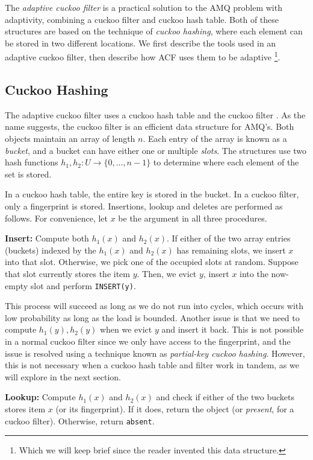 \documentclass[../paper.tex]{subfiles}
\begin{document}
\newcommand{\on}{\operatorname}
The \emph{adaptive cuckoo filter} \cite{adaptive-cuckoo} is a practical solution to the AMQ problem with adaptivity, combining a cuckoo filter and cuckoo hash table. Both of these structures are based on the
technique of \emph{cuckoo hashing}, where each element can be stored in two different locations. We first describe the tools used in an adaptive cuckoo filter, then describe how ACF uses them to be adaptive
\footnote{Which we will keep brief since the reader invented this data structure.}.

\subsection{Cuckoo Hashing}
The adaptive cuckoo filter uses a cuckoo hash table \cite{cuckoo-hash} and the cuckoo filter \cite{cuckoo-filter}. As the name suggests, the cuckoo filter is an
efficient data structure for AMQ's. Both objects maintain an array of length $n$. Each entry of the array is known as a \emph{bucket}, and a bucket can have either one or multiple \emph{slots}.
The structures use two hash functions $h_1,h_2:U\to \{0,\ldots,n-1\}$ to determine where each element of the set is stored.

In a cuckoo hash table, the entire key is stored in the bucket. In a cuckoo filter, only a fingerprint is stored. Insertions, lookup and deletes are performed as follows. For convenience, let $x$ be the argument in all three procedures.

\textbf{Insert:} Compute both $h_1(x)$ and $h_2(x)$. If either of the two array entries (buckets) indexed by the $h_1(x)$ and $h_2(x)$ has remaining slots, we insert $x$ into that slot.
Otherwise, we pick one of the occupied slots at random. Suppose that slot currently stores the item $y$. Then, we evict $y$, insert $x$ into the now-empty slot and perform \texttt{INSERT(y)}.

This process will succeed as long as we do not run into cycles, which occurs with low probability as long as the load is bounded. Another issue is that we need to compute $h_1(y),h_2(y)$
when we evict $y$ and insert it back. This is not possible in a normal cuckoo filter since we only have access to the fingerprint, and the issue is resolved using a technique known as \emph{partial-key cuckoo hashing}.
However, this is not necessary when a cuckoo hash table and filter work in tandem, as we will explore in the next section.

\textbf{Lookup:} Compute $h_1(x)$ and $h_2(x)$ and check if either of the two buckets stores item $x$ (or its fingerprint). If it does, return the object (or \textit{present}, for a cuckoo filter). Otherwise, return \texttt{absent}.
\end{document}
